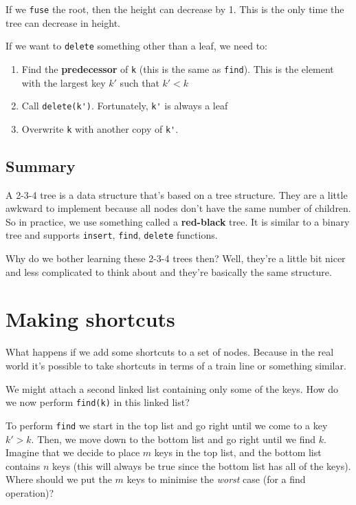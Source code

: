 \documentclass[11pt,a4paper,titlepage,dvipsnames,cmyk]{scrartcl}
\begin{document}
If we \lstinline|fuse| the root, then the height can decrease by 1. This
is the only time the tree can decrease in height.

If we want to \lstinline|delete| something other than a leaf, we need to:
\begin{enumerate}
    \item Find the \textbf{predecessor} of \lstinline|k| (this is the same
        as \lstinline|find|). This is the element with the largest key
        $k'$ such that $k' < k$
    \item Call \lstinline|delete(k')|. Fortunately, \lstinline|k'| is
        always a leaf
    \item Overwrite \lstinline|k| with another copy of \lstinline|k'|.
\end{enumerate}

\subsection{Summary}%
\label{sub:Summary}
A 2-3-4 tree is a data structure that's based on a tree structure. They are
a little awkward to implement because all nodes don't have the same number
of children. So in practice, we use something called a
\textbf{red-black} tree. It is similar to a binary tree and supports
\lstinline|insert|, \lstinline|find|, \lstinline|delete| functions.

Why do we bother learning these 2-3-4 trees then? Well, they're a little
bit nicer and less complicated to think about and they're basically the
same structure.

\section{Making shortcuts}%
\label{sec:shortcuts}
What happens if we add some shortcuts to a set of nodes. Because in the
real world it's possible to take shortcuts in terms of a train line or
something similar.

We might attach a second linked list containing only some of the keys. How
do we now perform \lstinline|find(k)| in this linked list?

To perform \lstinline|find| we start in the top list and go right until
we come to a key $k' > k$. Then, we move down to the bottom list and go
right until we find $k$. Imagine that we decide to place $m$ keys in the
top list, and the bottom list contains $n$ keys (this will always be true
since the bottom list has all of the keys). Where should we put the $m$
keys to minimise the \textit{worst} case (for a find operation)?
\end{document}
